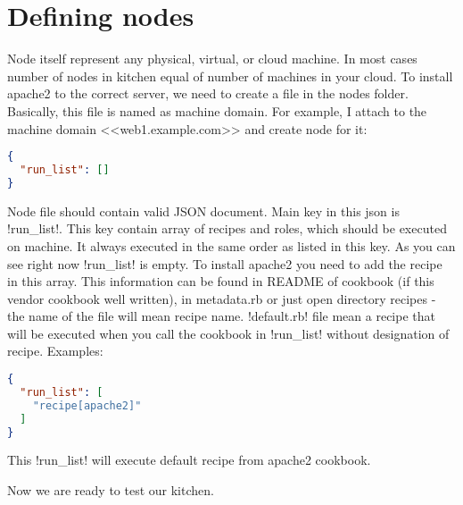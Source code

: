 \section{Defining nodes}
\label{sec:solo-node}

Node itself represent any physical, virtual, or cloud machine. In most cases number of nodes in kitchen equal of number of machines in your cloud. To install apache2 to the correct server, we need to create a file in the nodes folder. Basically, this file is named as machine domain. For example, I attach to the machine domain <<web1.example.com>> and create node for it:

\begin{lstlisting}[language=JSON,label=lst:my-cloud-node1,title=my-cloud/nodes/web1.example.com.json]
{
  "run_list": []
}
\end{lstlisting}

Node file should contain valid JSON document. Main key in this json is \inline!run_list!. This key contain array of recipes and roles, which should be executed on machine. It always executed in the same order as listed in this key. As you can see right now \inline!run_list! is empty. To install apache2 you need to add the recipe in this array. This information can be found in README of cookbook (if this vendor cookbook well written), in metadata.rb or just open directory recipes - the name of the file will mean recipe name. \inline!default.rb! file mean a recipe that will be executed when you call the cookbook in \inline!run_list! without designation of recipe. Examples:

\begin{lstlisting}[language=JSON,label=lst:my-cloud-node2,title=my-cloud/nodes/web1.example.com.json]
{
  "run_list": [
    "recipe[apache2]"
  ]
}
\end{lstlisting}

This \inline!run_list! will execute default recipe from apache2 cookbook.

Now we are ready to test our kitchen.
